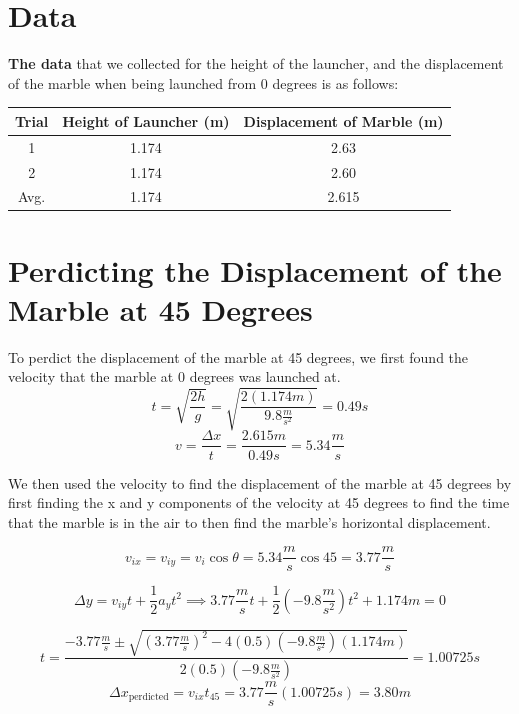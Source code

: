 \documentclass{report}
\begin{document}
\section{Data}

\textbf{The data} that we collected for the height of the launcher, and the displacement of the marble when being launched from 0 degrees is as follows:

\begin{center}
\begin{tabular}{ |c|c|c| } 
 \hline
 Trial & Height of Launcher (m) & Displacement of Marble (m) \\ 
 \hline
 1 & 1.174 & 2.63 \\ 
 2 & 1.174 & 2.60 \\ 
 Avg. & 1.174 & 2.615 \\ 
 \hline

\end{tabular}

\end{center} 

\section{Perdicting the Displacement of the Marble at 45 Degrees}

To perdict the displacement of the marble at 45 degrees, we first found the velocity that the marble at 0 degrees was launched at. 
$$ t = \sqrt{\frac{2h}{g}} = \sqrt{\frac{2(1.174 m)}{9.8 \frac{m}{s^2}}} = 0.49 s $$
$$ v = \frac{\Delta x}{t} = \frac{2.615 m}{0.49 s} = 5.34 \frac{m}{s} $$

We then used the velocity to find the displacement of the marble at 45 degrees by first finding the x and y components of the velocity at 45 degrees to find the time that the marble is in the air to then find the marble's horizontal displacement. 

$$ v_{ix} = v_{iy} = v_i \cos{\theta} = 5.34 \frac{m}{s} \cos{45} = 3.77 \frac{m}{s} $$ 

$$ \Delta y = v_{iy} t + \frac{1}{2} a_y t^2 \implies 3.77 \frac{m}{s} t + \frac{1}{2} (-9.8 \frac{m}{s^2}) t^2 + 1.174m = 0 $$ 


$$ t = \frac{-3.77 \frac{m}{s} \pm \sqrt{(3.77 \frac{m}{s})^2 - 4(0.5)(-9.8 \frac{m}{s^2})(1.174m)}}{2(0.5)(-9.8 \frac{m}{s^2})} = 1.00725s $$
$$ \Delta x_{\mathrm{perdicted}} = v_{ix} t_{45} = 3.77 \frac{m}{s} (1.00725 s) = 3.80 m $$ 
\end{document}
